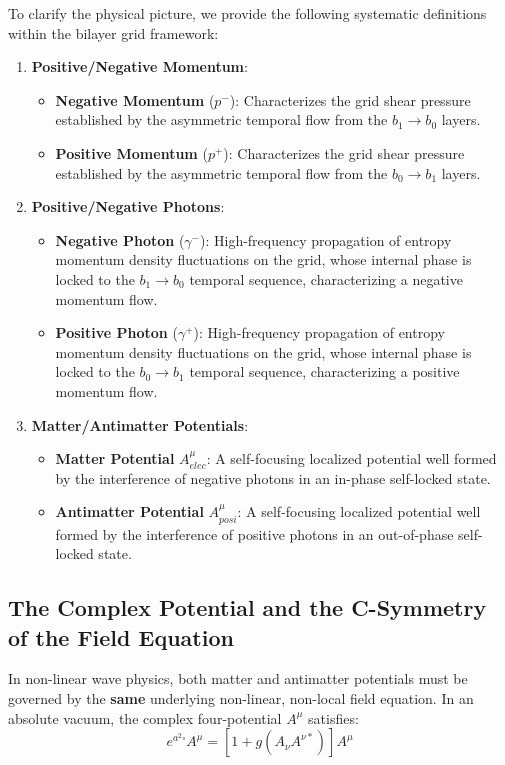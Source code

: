 \documentclass[12pt, a4paper]{article}
\begin{document}
To clarify the physical picture, we provide the following systematic definitions within the bilayer grid framework:
\begin{enumerate}
    \item \textbf{Positive/Negative Momentum}:
    \begin{itemize}
        \item \textbf{Negative Momentum} ($p^-$): Characterizes the grid shear pressure established by the asymmetric temporal flow from the $b_1 \to b_0$ layers.
        \item \textbf{Positive Momentum} ($p^+$): Characterizes the grid shear pressure established by the asymmetric temporal flow from the $b_0 \to b_1$ layers.
    \end{itemize}
    \item \textbf{Positive/Negative Photons}:
    \begin{itemize}
        \item \textbf{Negative Photon} ($\gamma^-$): High-frequency propagation of entropy momentum density fluctuations on the grid, whose internal phase is locked to the $b_1 \to b_0$ temporal sequence, characterizing a negative momentum flow.
        \item \textbf{Positive Photon} ($\gamma^+$): High-frequency propagation of entropy momentum density fluctuations on the grid, whose internal phase is locked to the $b_0 \to b_1$ temporal sequence, characterizing a positive momentum flow.
    \end{itemize}
    \item \textbf{Matter/Antimatter Potentials}:
    \begin{itemize}
        \item \textbf{Matter Potential} $A^\mu_{elec}$: A self-focusing localized potential well formed by the interference of negative photons in an in-phase self-locked state.
        \item \textbf{Antimatter Potential} $A^\mu_{posi}$: A self-focusing localized potential well formed by the interference of positive photons in an out-of-phase self-locked state.
    \end{itemize}
\end{enumerate}

\subsection{The Complex Potential and the C-Symmetry of the Field Equation}

In non-linear wave physics, both matter and antimatter potentials must be governed by the \textbf{same} underlying non-linear, non-local field equation. In an absolute vacuum, the complex four-potential $A^\mu$ satisfies:
\begin{equation}
    e^{a^2 \square} A^\mu = \left[ 1 + g(A_\nu A^{\nu *}) \right] A^\mu \label{eq:nonlinear_field_eq}
\end{equation}
\end{document}
